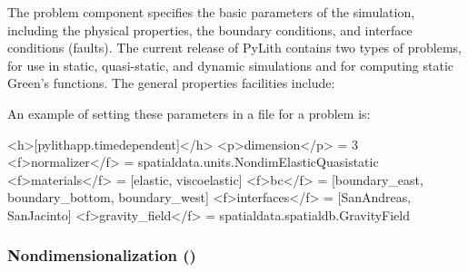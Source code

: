 The problem component specifies the basic parameters of the simulation,
including the physical properties, the boundary conditions, and interface
conditions (faults). The current release of PyLith contains two types
of problems,  for use in static, quasi-static,
and dynamic simulations and  for computing static
Green's functions. The general properties facilities include:
\begin{inventory}
\end{inventory}
An example of setting these parameters in a  file for
a problem is:
\begin{cfg}
<h>[pylithapp.timedependent]</h>
<p>dimension</p> = 3
<f>normalizer</f> = spatialdata.units.NondimElasticQuasistatic
<f>materials</f> = [elastic, viscoelastic]
<f>bc</f> = [boundary_east, boundary_bottom, boundary_west]
<f>interfaces</f> = [SanAndreas, SanJacinto]
<f>gravity_field</f> = spatialdata.spatialdb.GravityField
\end{cfg}

\subsubsection{Nondimensionalization ()}

